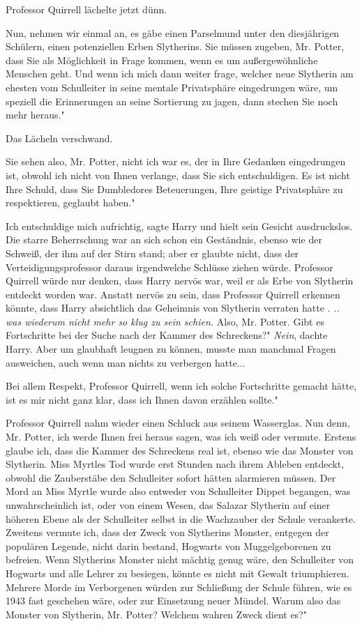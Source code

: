 Professor Quirrell lächelte jetzt dünn.

\glqq Nun, nehmen wir einmal an, es gäbe einen Parselmund unter den diesjährigen
Schülern, einen potenziellen Erben Slytherins. Sie müssen zugeben, Mr. Potter,
dass Sie als Möglichkeit in Frage kommen, wenn es um außergewöhnliche Menschen
geht. Und wenn ich mich dann weiter frage, welcher neue Slytherin am ehesten vom
Schulleiter in seine mentale Privatsphäre eingedrungen wäre, um speziell die
Erinnerungen an seine Sortierung zu jagen, dann stechen Sie noch mehr heraus."

Das Lächeln verschwand.

\glqq Sie sehen also, Mr. Potter, nicht ich war es, der in Ihre Gedanken
eingedrungen ist, obwohl ich nicht von Ihnen verlange, dass Sie sich
entschuldigen. Es ist nicht Ihre Schuld, dass Sie Dumbledores Beteuerungen, Ihre
geistige Privatsphäre zu respektieren, geglaubt haben."

\glqq Ich entschuldige mich aufrichtig\grqq{}, sagte Harry und hielt sein
Gesicht ausdruckslos. Die starre Beherrschung war an sich schon ein Geständnis,
ebenso wie der Schweiß, der ihm auf der Stirn stand; aber er glaubte nicht, dass
der Verteidigungsprofessor daraus irgendwelche Schlüsse ziehen würde. Professor
Quirrell würde nur denken, dass Harry nervös war, weil er als Erbe von Slytherin
entdeckt worden war. Anstatt nervös zu sein, dass Professor Quirrell erkennen
könnte, dass Harry absichtlich das Geheimnis von Slytherin verraten hatte .
\emph{.. was wiederum nicht mehr so klug zu sein schien. } \glqq Also, Mr.
Potter. Gibt es Fortschritte bei der Suche nach der Kammer des Schreckens?"
\emph{Nein}, dachte Harry. Aber um glaubhaft leugnen zu können, musste man
manchmal Fragen ausweichen, auch wenn man nichts zu verbergen hatte...

\glqq Bei allem Respekt, Professor Quirrell, wenn ich solche Fortschritte
gemacht hätte, ist es mir nicht ganz klar, dass ich Ihnen davon erzählen
sollte."

Professor Quirrell nahm wieder einen Schluck aus seinem Wasserglas. \glqq Nun
denn, Mr. Potter, ich werde Ihnen frei heraus sagen, was ich weiß oder vermute.
Erstens glaube ich, dass die Kammer des Schreckens real ist, ebenso wie das
Monster von Slytherin. Miss Myrtles Tod wurde erst Stunden nach ihrem Ableben
entdeckt, obwohl die Zauberstäbe den Schulleiter sofort hätten alarmieren
müssen. Der Mord an Miss Myrtle wurde also entweder von Schulleiter Dippet
begangen, was unwahrscheinlich ist, oder von einem Wesen, das Salazar Slytherin
auf einer höheren Ebene als der Schulleiter selbst in die Wachzauber der Schule
verankerte. Zweitens vermute ich, dass der Zweck von Slytherins Monster,
entgegen der populären Legende, nicht darin bestand, Hogwarts von
Muggelgeborenen zu befreien. Wenn Slytherins Monster nicht mächtig genug wäre,
den Schulleiter von Hogwarts und alle Lehrer zu besiegen, könnte es nicht mit
Gewalt triumphieren. Mehrere Morde im Verborgenen würden zur Schließung der
Schule führen, wie es 1943 fast geschehen wäre, oder zur Einsetzung neuer
Mündel. Warum also das Monster von Slytherin, Mr. Potter? Welchem wahren Zweck
dient es?"

